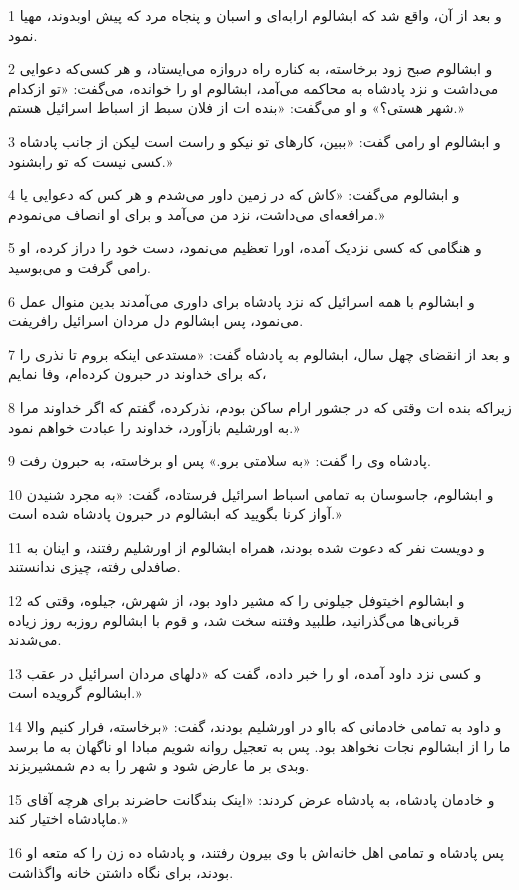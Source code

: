 \par 1 و بعد از آن، واقع شد که ابشالوم ارابه‌ای و اسبان و پنجاه مرد که پیش اوبدوند، مهیا نمود.
\par 2 و ابشالوم صبح زود برخاسته، به کناره راه دروازه می‌ایستاد، و هر کسی‌که دعوایی می‌داشت و نزد پادشاه به محاکمه می‌آمد، ابشالوم او را خوانده، می‌گفت: «تو ازکدام شهر هستی؟» و او می‌گفت: «بنده ات از فلان سبط از اسباط اسرائیل هستم.»
\par 3 و ابشالوم او رامی گفت: «ببین، کارهای تو نیکو و راست است لیکن از جانب پادشاه کسی نیست که تو رابشنود.»
\par 4 و ابشالوم می‌گفت: «کاش که در زمین داور می‌شدم و هر کس که دعوایی یا مرافعه‌ای می‌داشت، نزد من می‌آمد و برای او انصاف می‌نمودم.»
\par 5 و هنگامی که کسی نزدیک آمده، اورا تعظیم می‌نمود، دست خود را دراز کرده، او رامی گرفت و می‌بوسید.
\par 6 و ابشالوم با همه اسرائیل که نزد پادشاه برای داوری می‌آمدند بدین منوال عمل می‌نمود، پس ابشالوم دل مردان اسرائیل رافریفت.
\par 7 و بعد از انقضای چهل سال، ابشالوم به پادشاه گفت: «مستدعی اینکه بروم تا نذری را که برای خداوند در حبرون کرده‌ام، وفا نمایم،
\par 8 زیراکه بنده ات وقتی که در جشور ارام ساکن بودم، نذرکرده، گفتم که اگر خداوند مرا به اورشلیم بازآورد، خداوند را عبادت خواهم نمود.»
\par 9 پادشاه وی را گفت: «به سلامتی برو.» پس او برخاسته، به حبرون رفت.
\par 10 و ابشالوم، جاسوسان به تمامی اسباط اسرائیل فرستاده، گفت: «به مجرد شنیدن آواز کرنا بگویید که ابشالوم در حبرون پادشاه شده است.»
\par 11 و دویست نفر که دعوت شده بودند، همراه ابشالوم از اورشلیم رفتند، و اینان به صافدلی رفته، چیزی ندانستند. 
\par 12 و ابشالوم اخیتوفل جیلونی را که مشیر داود بود، از شهرش، جیلوه، وقتی که قربانی‌ها می‌گذرانید، طلبید وفتنه سخت شد، و قوم با ابشالوم روزبه روز زیاده می‌شدند.
\par 13 و کسی نزد داود آمده، او را خبر داده، گفت که «دلهای مردان اسرائیل در عقب ابشالوم گرویده است.»
\par 14 و داود به تمامی خادمانی که بااو در اورشلیم بودند، گفت: «برخاسته، فرار کنیم والا ما را از ابشالوم نجات نخواهد بود. پس به تعجیل روانه شویم مبادا او ناگهان به ما برسد وبدی بر ما عارض شود و شهر را به دم شمشیربزند.
\par 15 و خادمان پادشاه، به پادشاه عرض کردند: «اینک بندگانت حاضرند برای هرچه آقای ماپادشاه اختیار کند.»
\par 16 پس پادشاه و تمامی اهل خانه‌اش با وی بیرون رفتند، و پادشاه ده زن را که متعه او بودند، برای نگاه داشتن خانه واگذاشت.
